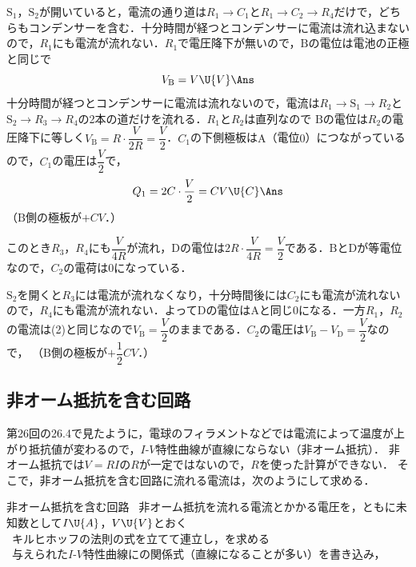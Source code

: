 \begin{reidaiunit}
\begin{kaitou}
\begin{komon}
 $\mathrm{S}_1$，$\mathrm{S}_2$が開いていると，電流の通り道は$R_1\to C_1$と$R_1\to C_2\to R_4$だけで，どちらもコンデンサーを含む．十分時間が経つとコンデンサーに電流は流れ込まないので，$R_1$にも電流が流れない．$R_1$で電圧降下が無いので，$\mathrm{B}$の電位は電池の正極と同じで
       \[V_{\mathrm{B}}=V\U{V}\Ans\]
 十分時間が経つとコンデンサーに電流は流れないので，電流は$R_1\to\mathrm{S}_1\to R_2$と$\mathrm{S}_2\to R_3\to R_4$の2本の道だけを流れる．$R_1$と$R_2$は直列なので
 $\mathrm{B}$の電位は$R_2$の電圧降下に等しく$V_{\mathrm{B}}=R\cdot\dfrac{V}{2R}=\dfrac{V}{2}$．$C_1$の下側極板は$\mathrm{A}$（電位$0$）につながっているので，$C_1$の電圧は$\dfrac{V}{2}$で，
       \[Q_1=2C\cdot\frac{V}{2}=CV\U{C}\Ans\]
       （$\mathrm{B}$側の極板が$+CV$．）
       \begin{chuu}
       このとき$R_3$，$R_4$にも$\dfrac{V}{4R}$が流れ，$\mathrm{D}$の電位は$2R\cdot\dfrac{V}{4R}=\dfrac{V}{2}$である．$\mathrm{B}$と$\mathrm{D}$が等電位なので，$C_2$の電荷は$0$になっている．
       \end{chuu}
 $\mathrm{S}_2$を開くと$R_3$には電流が流れなくなり，十分時間後には$C_2$にも電流が流れないので，$R_4$にも電流が流れない．よって$\mathrm{D}$の電位は$\mathrm{A}$と同じ$0$になる．一方$R_1$，$R_2$の電流は(2)と同じなので$V_{\mathrm{B}}=\dfrac{V}{2}$のままである．$C_2$の電圧は$V_{\mathrm{B}}-V_{\mathrm{D}}=\dfrac{V}{2}$なので，
       （$\mathrm{B}$側の極板が$+\dfrac{1}{2}CV$．）
\end{komon}
\end{kaitou}
\end{reidaiunit}

\subsection{非オーム抵抗を含む回路}

第26回の26.4で見たように，電球のフィラメントなどでは電流によって温度が上がり抵抗値が変わるので，$I$-$V$特性曲線が直線にならない（非オーム抵抗）．
非オーム抵抗では$V=RI$の$R$が一定ではないので，$R$を使った計算ができない．
そこで，非オーム抵抗を含む回路に流れる電流は，次のようにして求める．

\bsNeed{40mm}
\begin{matome}{非オーム抵抗を含む回路}
 \ 非オーム抵抗を流れる電流とかかる電圧を，ともに未知数として$I\U{A}$，$V\U{V}$とおく\\
 \ キルヒホッフの法則の式を立てて連立し，を求める\\
 \ 与えられた$I$-$V$特性曲線にの関係式（直線になることが多い）を書き込み，
\end{matome}

